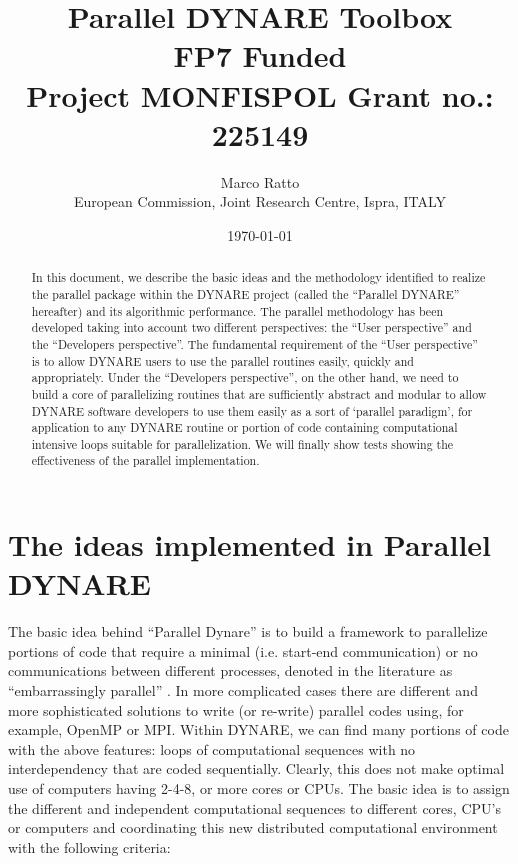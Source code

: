 \documentclass[12pt,a4paper,pdftex]{article}
\begin{document}
\title{Parallel DYNARE Toolbox\\FP7 Funded \\ Project MONFISPOL Grant no.: 225149}

\author{Marco Ratto\\
European Commission, Joint Research Centre, Ispra, ITALY
}
\date{\today}
\newpage
\singlespacing
{\footnotesize
\maketitle \tableofcontents
}
\newpage
\doublespacing
\begin{abstract}
In this document, we describe the basic ideas and the methodology identified to realize the parallel package within the DYNARE project (called the ``Parallel DYNARE'' hereafter) and its algorithmic performance.
The parallel methodology has been developed taking into account two different perspectives: the ``User perspective'' and the ``Developers perspective''. The fundamental requirement of the ``User perspective'' is to allow DYNARE users to use the parallel routines easily, quickly and appropriately. Under the ``Developers perspective'', on the other hand, we need to build a core of parallelizing routines that are sufficiently abstract and modular to allow DYNARE software developers to use them easily as a sort of `parallel paradigm', for application to any DYNARE routine or portion of code containing computational intensive loops suitable for parallelization.
We will finally show tests showing the effectiveness of the parallel implementation.
\end{abstract}
\newpage
\section{The ideas implemented in Parallel DYNARE}
The basic idea behind ``Parallel Dynare'' is to build a framework to parallelize portions of code that require a minimal (i.e. start-end communication) or no communications between different processes, denoted in the literature as ``embarrassingly parallel'' \citep{GoffeCreel_Grid_2008,Barney_2009}.  In more complicated cases there are different and more sophisticated solutions to write (or re-write) parallel codes using, for example, OpenMP or MPI.
Within DYNARE, we can find many portions of code with the above features: loops of computational sequences with no interdependency that are coded sequentially. Clearly, this does not make optimal use of computers having 2-4-8, or more cores or CPUs.
The basic idea is to assign the different and independent computational sequences to different cores, CPU's or computers and coordinating this new distributed computational environment with the following criteria:
\end{document}
